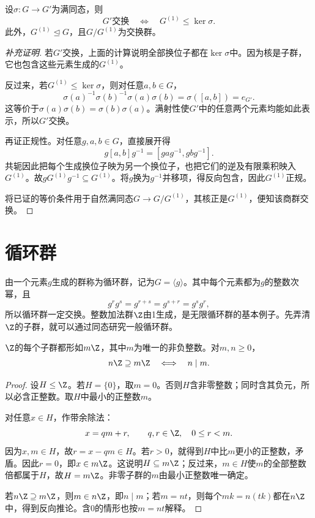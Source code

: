 \begin{theorem}\label{p2:abelianization}
设$\sigma:G\to G'$为满同态，则
\[
G'\text{交换}\quad\Longleftrightarrow\quad G^{(1)}\leq\ker\sigma.
\]
此外，$G^{(1)}\trianglelefteq G$，且$G/G^{(1)}$为交换群。
\end{theorem}
\begin{proof}[补充证明]
若$G'$交换，上面的计算说明全部换位子都在$\ker\sigma$中。因为核是子群，它也包含这些元素生成的$G^{(1)}$。

反过来，若$G^{(1)}\leq\ker\sigma$，则对任意$a,b\in G$，
\[
\sigma(a)^{-1}\sigma(b)^{-1}\sigma(a)\sigma(b)
=\sigma([a,b])=e_{G'}.
\]
这等价于$\sigma(a)\sigma(b)=\sigma(b)\sigma(a)$。满射性使$G'$中的任意两个元素均能如此表示，所以$G'$交换。

再证正规性。对任意$g,a,b\in G$，直接展开得
\[
g[a,b]g^{-1}=[gag^{-1},gbg^{-1}].
\]
共轭因此把每个生成换位子映为另一个换位子，也把它们的逆及有限乘积映入$G^{(1)}$。故$gG^{(1)}g^{-1}\subseteq G^{(1)}$。将$g$换为$g^{-1}$并移项，得反向包含，因此$G^{(1)}$正规。

将已证的等价条件用于自然满同态$G\to G/G^{(1)}$，其核正是$G^{(1)}$，便知该商群交换。
\end{proof}

\section{循环群}

\label{p2:concept:c2-l204}由一个元素$g$生成的群称为循环群，记为$G=\langle g\rangle$。其中每个元素都为$g$的整数次幂，且
\[
g^rg^s=g^{r+s}=g^{s+r}=g^sg^r,
\]
所以循环群一定交换。整数加法群$\Z$由1生成，是无限循环群的基本例子。先弄清$\Z$的子群，就可以通过同态研究一般循环群。

\begin{proposition}
$\Z$的每个子群都形如$m\Z$，其中$m$为唯一的非负整数。对$m,n\geq0$，
\[
n\Z\supseteq m\Z\quad\Longleftrightarrow\quad n\mid m.
\]
\end{proposition}
\begin{proof}
设$H\leq\Z$。若$H=\{0\}$，取$m=0$。否则$H$含非零整数；同时含其负元，所以必含正整数。取$H$中最小的正整数$m$。

对任意$x\in H$，作带余除法：
\[
x=qm+r,\qquad q,r\in\Z,\quad0\leq r<m.
\]
因为$x,m\in H$，故$r=x-qm\in H$。若$r>0$，就得到$H$中比$m$更小的正整数，矛盾。因此$r=0$，即$x\in m\Z$。这说明$H\subseteq m\Z$；反过来，$m\in H$使$m$的全部整数倍都属于$H$，故$H=m\Z$。非零子群的$m$由最小正整数唯一确定。

若$n\Z\supseteq m\Z$，则$m\in n\Z$，即$n\mid m$；若$m=nt$，则每个$mk=n(tk)$都在$n\Z$中，得到反向推论。含0的情形也按$m=nt$解释。
\end{proof}

